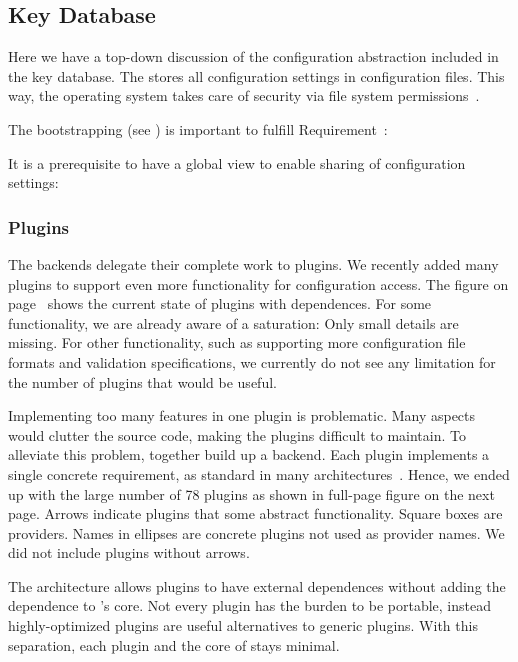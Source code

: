 \subsection{Key Database}

Here we have a top-down discussion of the configuration abstraction included in the key database.
The  stores all configuration settings in configuration files.
This way, the operating system takes care of security via file system permissions~\cite{raab2016unanticipated}.

The bootstrapping (see ) is important to fulfill Requirement~:
\reqSimple*

It is a prerequisite to have a global view to enable sharing of configuration settings:
\reqSharing*



\subsubsection{Plugins}
\label{sec:plugins}

\newcommand{\nrplugins}{78}


The backends delegate their complete work to plugins.
We recently added many plugins to support even more functionality for configuration access.
The figure on page~\pageref{fig:plugins} shows the current state of plugins with dependences.
For some functionality, we are already aware of a saturation:
Only small details are missing.
For other functionality, such as supporting more configuration file formats and validation specifications, we currently do not see any limitation for the number of plugins that would be useful.



Implementing too many features in one plugin is problematic.
Many aspects would clutter the source code, making the plugins difficult to maintain.
To alleviate this problem,  together build up a backend.
Each plugin implements a single concrete requirement, as standard in many architectures~\cite{pinson1978unix,cardozo2016emergent}.
Hence, we ended up with the large number of \nrplugins{} plugins as shown in full-page figure on the next page.
Arrows indicate plugins that  some abstract functionality.
Square boxes are providers.
Names in ellipses are concrete plugins not used as provider names.
We did not include plugins without arrows.


The architecture allows plugins to have external dependences without adding the dependence to \elektra{}'s core.
Not every plugin has the burden to be portable, instead highly-optimized plugins are useful alternatives to generic plugins.
With this separation, each plugin and the core of \elektra{} stays minimal.

